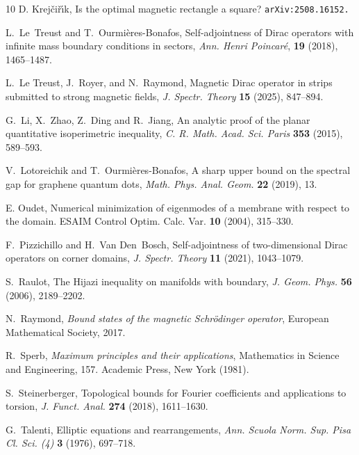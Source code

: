 \documentclass[11pt,a4paper]{amsart}
\numberwithin{figure}{section}
\numberwithin{equation}{section}
\theoremstyle{plain}%
\theoremstyle{remark}
\theoremstyle{plain}
\begin{document}
\begin{thebibliography}{10}
	D. Krej{\v{c}}i{\v{r}}{\'{\i}}k, Is the optimal magnetic rectangle a square? \texttt{arXiv:2508.16152.}
	
	L.~Le~Treust and T.~Ourmi{\`e}res-Bonafos,
	Self-adjointness of {Dirac} operators with infinite mass boundary
	conditions in sectors, {\em Ann. Henri Poincar{\'e}}, {\bf 19} (2018),
	1465--1487.
	
	L.~Le Treust, J.~Royer, and N.~Raymond,
	 Magnetic {Dirac} operator in strips submitted to strong magnetic	fields, {\it J. Spectr. Theory} {\bf 15} (2025),
	  847--894.
	
	G.~Li, X.~Zhao, Z.~Ding and R.~Jiang, An analytic proof of the planar quantitative isoperimetric inequality, {\it C. R.
	Math. Acad. Sci. Paris} {\bf 353} (2015), 589--593.
	
	V.~Lotoreichik and T.~Ourmi{\`e}res-Bonafos,
	A sharp upper bound on the spectral gap for graphene quantum dots, {\em Math. Phys. Anal. Geom.} {\bf 22} (2019),
	13.
	
	E. Oudet, Numerical minimization of eigenmodes of a membrane with respect to the domain. {\rm ESAIM Control Optim. Calc. Var.} {\bf 10} (2004), 315--330.
	
	F.~Pizzichillo and H.~Van Den~Bosch,
	Self-adjointness of two-dimensional {Dirac} operators on corner domains, {\em J. Spectr. Theory} {\bf 11} (2021),
	1043--1079.
	
	S.~Raulot, The {Hijazi} inequality on manifolds with boundary, {\em J. Geom. Phys.} {\bf 56} (2006),
	2189--2202.
	
	N.~Raymond, 
	{\it Bound states of the magnetic Schr\"{o}dinger operator}, European Mathematical Society, 2017.
	
	R.~Sperb, {\it Maximum principles and their applications}, Mathematics in Science and Engineering, 157. Academic Press, New York (1981).
	
   S.~Steinerberger, Topological bounds for Fourier coefficients and applications to torsion, {\it J. Funct. Anal.} {\bf 274} (2018), 1611--1630.
	
	G.~Talenti, Elliptic equations and rearrangements, {\em Ann. Scuola Norm. Sup. Pisa Cl. Sci. (4)}  {\bf 3} (1976),
	697--718.

\end{thebibliography}
\end{document}
